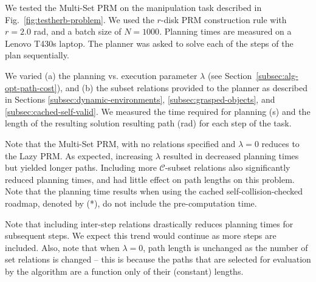 We tested the Multi-Set PRM on the manipulation task
described in Fig.~\ref{fig:testherb-problem}.
We used the $r$-disk PRM construction rule with $r=2.0$ rad,
and a batch size of $N=1000$.
Planning times are measured on a Lenovo T430s laptop.
The planner was asked to solve each of the steps of the plan
sequentially.

We varied
(a) the planning vs. execution parameter $\lambda$
(see Section~\ref{subsec:alg-opt-path-cost}), and
(b) the subset relations provided to the planner
as described in Sections
\ref{subsec:dynamic-environments},
\ref{subsec:grasped-objects},
and \ref{subsec:cached-self-valid}.
We measured the time required for planning (s)
and the length of the resulting solution resulting path (rad)
for each step of the task.

Note that the Multi-Set PRM,
with no relations specified and $\lambda=0$
reduces to the Lazy PRM.
As expected,
increasing $\lambda$ resulted in decreased planning times
but yielded longer paths.
Including more $\mathcal{C}$-subset relations
also significantly reduced planning times,
and had little effect on path lengths on this problem.
Note that the planning time results when using
the cached self-collision-checked roadmap, denoted by (*),
do not include the pre-computation time.

Note that including inter-step relations drastically
reduces planning times for subsequent steps.
We expect this trend would continue as more steps are included.
Also, note that when $\lambda=0$,
path length is unchanged as the number of set relations is
changed
-- this is because the paths that are selected for evaluation
by the algorithm are a function only of their (constant) lengths.

%


